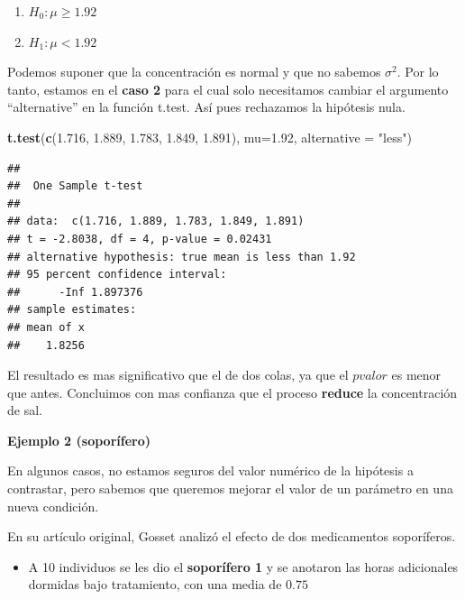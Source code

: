 \documentclass[
]{book}
\newenvironment{Shaded}{\begin{snugshade}}{\end{snugshade}}
\newcommand{\AttributeTok}[1]{\textcolor[rgb]{0.13,0.29,0.53}{#1}}
\newcommand{\FloatTok}[1]{\textcolor[rgb]{0.00,0.00,0.81}{#1}}
\newcommand{\FunctionTok}[1]{\textcolor[rgb]{0.13,0.29,0.53}{\textbf{#1}}}
\newcommand{\NormalTok}[1]{#1}
\newcommand{\StringTok}[1]{\textcolor[rgb]{0.31,0.60,0.02}{#1}}
\providecommand{\tightlist}{%
  \setlength{\itemsep}{0pt}\setlength{\parskip}{0pt}}
\begin{document}
\begin{enumerate}
\def\labelenumi{\alph{enumi}.}
\tightlist
\item
  \(H_0:\mu\geq 1.92\)
\item
  \(H_1:\mu < 1.92\)
\end{enumerate}

Podemos suponer que la concentración es normal y que no sabemos \(\sigma^2\). Por lo tanto, estamos en el \textbf{caso 2} para el cual solo necesitamos cambiar el argumento ``alternative'' en la función t.test. Así pues rechazamos la hipótesis nula.

\begin{Shaded}
\begin{Highlighting}[]
\FunctionTok{t.test}\NormalTok{(}\FunctionTok{c}\NormalTok{(}\FloatTok{1.716}\NormalTok{, }\FloatTok{1.889}\NormalTok{, }\FloatTok{1.783}\NormalTok{, }\FloatTok{1.849}\NormalTok{, }\FloatTok{1.891}\NormalTok{), }
       \AttributeTok{mu=}\FloatTok{1.92}\NormalTok{, }\AttributeTok{alternative =} \StringTok{"less"}\NormalTok{)}
\end{Highlighting}
\end{Shaded}

\begin{verbatim}
## 
##  One Sample t-test
## 
## data:  c(1.716, 1.889, 1.783, 1.849, 1.891)
## t = -2.8038, df = 4, p-value = 0.02431
## alternative hypothesis: true mean is less than 1.92
## 95 percent confidence interval:
##      -Inf 1.897376
## sample estimates:
## mean of x 
##    1.8256
\end{verbatim}

El resultado es mas significativo que el de dos colas, ya que el \(pvalor\) es menor que antes. Concluimos con mas confianza que el proceso \textbf{reduce} la concentración de sal.

\textbf{Ejemplo 2 (soporífero)}

En algunos casos, no estamos seguros del valor numérico de la hipótesis a contrastar, pero sabemos que queremos mejorar el valor de un parámetro en una nueva condición.

En su artículo original, Gosset analizó el efecto de dos medicamentos soporíferos.

\begin{itemize}
\tightlist
\item
  A 10 individuos se les dio el \textbf{soporífero 1} y se anotaron las horas adicionales dormidas bajo tratamiento, con una media de \(0.75\)
\end{itemize}
\end{document}
